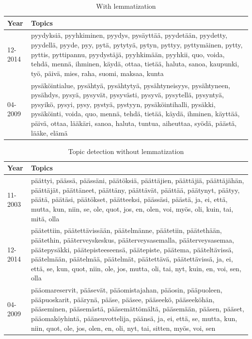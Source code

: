 \documentclass[conference]{IEEEtran}
\begin{document}
\begin{table}[htbp]
    \caption{With lemmatization}
    \begin{center}
        \begin{tabularx}{\linewidth}{| l | X |}
            \hline
            Year & Topics \\
            \hline
            12-2014 & pyydyksiä, pyyhkiminen, pyydys, pysäyttää, pyydetään, pyydetty, pyydellä, pyyde, pyy, pytä, pytytyä, pytyn, pyttyy, pyttymäinen, pytty, pyttis, pyttipannu, pyydystäjä, pyyhkimään, pyyhkii, quo, voida, tehdä, mennä, ihminen, käydä, ottaa, tietää, haluta, sanoa, kaupunki, työ, päivä, mies, raha, suomi, maksaa, kunta\\
            \hline
            04-2009 & pysäköintialue, pysähtyä, pysähtytyä, pysähtyneisyys, pysähtyneen, pysähdys, pysyä, pysyvät, pysyvästi, pysyvä, pysytellä, pysyntyä, pysyikö, pysyi, pysy, pystyä, pystyyn, pysäköintihalli, pysäkki, pysäköinti, voida, quo, mennä, tehdä, tietää, käydä, ihminen, käyttää, päivä, ottaa, lääkäri, sanoa, haluta, tuntua, aiheuttaa, syödä, päästä, lääke, elämä\\
            \hline
        \end{tabularx}
        \label{with_lemmatization}
    \end{center}
\end{table}

\begin{table}[htbp]
    \caption{Topic detection without lemmatization}
    \begin{center}
        \begin{tabularx}{\linewidth}{| l | X |}
            \hline
            Year & Topics \\
            \hline
            11-2003 & päättyi, päässä, päässäni, päätöksiä, päättäjien, päättäjiä, päättäjähän, päättäjät, päättäneet, päättäny, päättävät, päättää, päätynyt, päätyy, päätä, päätäsi, päätökset, päätteeksi, päässäsi, päästä, ja, ei, että, mutta, kun, niin, se, ole, quot, jos, en, olen, voi, myös, oli, kuin, tai, mitä, olla\\
            \hline
            12-2014 & päätettiin, päätettävissään, päätelmänne, päätetiin, päätethään, päätethin, pääterveyskeskus, pääterveysasemalla, pääterveysasemaa, päätepysäkki, päätepisteeseensä, päätepiste, päätema, pääteltävissä, päätelmään, päätelmää, päätelmät, päätettävä, päätettävissä, ja, ei, että, se, kun, quot, niin, ole, jos, mutta, oli, tai, nyt, kuin, en, voi, sen, olla\\
            \hline
            04-2009 & pääomareservit, pääsevät, pääomistajahan, pääosin, pääpuoleen, pääpuoskarit, päärynä, pääse, pääsee, pääseekö, pääseeköhän, pääseminen, pääsemästä, pääsemättömältä, pääsemään, pääsen, pääset, pääomaköyhintä, pääneuvottelija, päänsä, ja, ei, että, se, mutta, kun, niin, quot, ole, jos, olen, en, oli, nyt, tai, sitten, myös, voi, sen\\
            \hline
        \end{tabularx}
        \label{topic_detection_without_lemmatization}
    \end{center}
\end{table}
\end{document}
